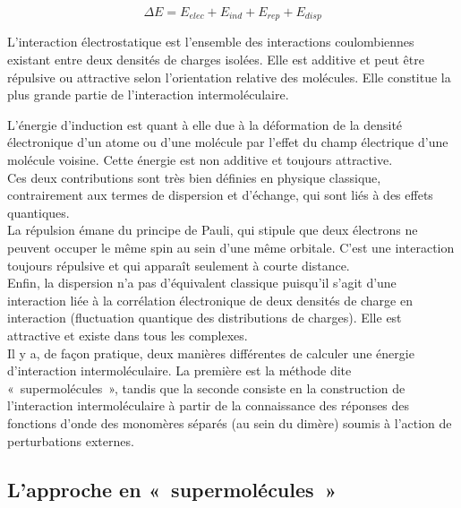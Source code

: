 \documentclass[12pt,a4paper]{book}
\begin{document}
	\begin{equation}
	\Delta E = E_{elec} + E_{ind} + E_{rep} + E_{disp}
	\end{equation} 
	
	L’interaction électrostatique est l’ensemble des interactions coulombiennes existant entre deux densités de charges isolées. Elle est additive et peut être répulsive ou attractive selon l’orientation relative des molécules. Elle constitue la plus grande partie de l’interaction intermoléculaire. 
	
	L’énergie d’induction est quant à elle due à la déformation de la densité électronique d’un atome ou d’une molécule par l’effet du champ électrique d’une molécule voisine. Cette énergie est non additive et toujours attractive.\\
	
	Ces deux contributions sont très bien définies en physique classique, contrairement aux termes de dispersion et d'échange, qui sont liés à des effets quantiques.\\
	
	La répulsion émane du principe de Pauli, qui stipule que deux électrons ne peuvent occuper le même spin au sein d’une même orbitale. C’est une interaction toujours répulsive et qui apparaît seulement à courte distance.\\
	
	Enfin, la dispersion n’a pas d’équivalent classique puisqu'il s'agit d'une interaction liée à la corrélation électronique de deux densités de charge en interaction (fluctuation quantique des distributions de charges). Elle est attractive et existe dans tous les complexes.\\
	
	Il y a, de façon pratique, deux manières différentes de calculer une énergie d’interaction intermoléculaire. La première est la méthode dite « supermolécules », tandis que la seconde consiste en la construction de l’interaction intermoléculaire à partir de la connaissance des réponses des fonctions d’onde des monomères séparés (au sein du dimère) soumis à l’action de perturbations externes.\\
	
	\subsection{L’approche en « supermolécules »}
	
\end{document}
